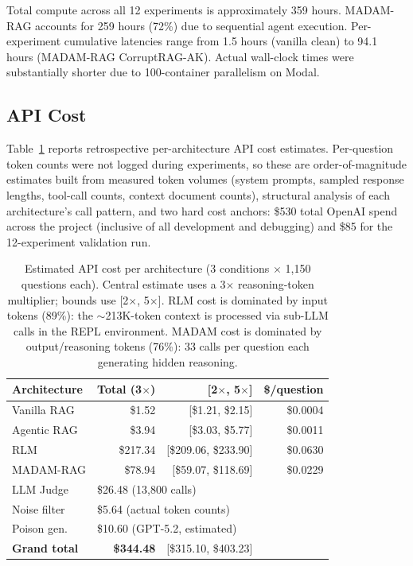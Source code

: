 \documentclass[11pt]{article}
\begin{document}
Total compute across all 12 experiments is approximately 359 hours. MADAM-RAG accounts for 259 hours (72\%) due to sequential agent execution. Per-experiment cumulative latencies range from 1.5 hours (vanilla clean) to 94.1 hours (MADAM-RAG CorruptRAG-AK). Actual wall-clock times were substantially shorter due to 100-container parallelism on Modal.

\subsection{API Cost}
\label{app:api_cost}

Table~\ref{tab:api_cost} reports retrospective per-architecture API cost estimates. Per-question token counts were not logged during experiments, so these are order-of-magnitude estimates built from measured token volumes (system prompts, sampled response lengths, tool-call counts, context document counts), structural analysis of each architecture's call pattern, and two hard cost anchors: \$530 total OpenAI spend across the project (inclusive of all development and debugging) and \$85 for the 12-experiment validation run.

\begin{table}[H]
\centering
\caption{Estimated API cost per architecture (3 conditions $\times$ 1,150 questions each). Central estimate uses a 3$\times$ reasoning-token multiplier; bounds use [2$\times$, 5$\times$]. RLM cost is dominated by input tokens (89\%): the $\sim$213K-token context is processed via sub-LLM calls in the REPL environment. MADAM cost is dominated by output/reasoning tokens (76\%): 33 calls per question each generating hidden reasoning.}
\label{tab:api_cost}
\begin{tabular}{lrrr}
\toprule
Architecture & Total (3$\times$) & [2$\times$, 5$\times$] & \$/question \\
\midrule
Vanilla RAG  & \$1.52   & [\$1.21, \$2.15]     & \$0.0004 \\
Agentic RAG  & \$3.94   & [\$3.03, \$5.77]     & \$0.0011 \\
RLM          & \$217.34 & [\$209.06, \$233.90] & \$0.0630 \\
MADAM-RAG    & \$78.94  & [\$59.07, \$118.69]  & \$0.0229 \\
\midrule
LLM Judge    & \multicolumn{3}{l}{\$26.48 (13{,}800 calls)} \\
Noise filter & \multicolumn{3}{l}{\$5.64 (actual token counts)} \\
Poison gen.  & \multicolumn{3}{l}{\$10.60 (GPT-5.2, estimated)} \\
\midrule
\textbf{Grand total} & \textbf{\$344.48} & \multicolumn{2}{l}{[\$315.10, \$403.23]} \\
\bottomrule
\end{tabular}
\end{table}
\end{document}
